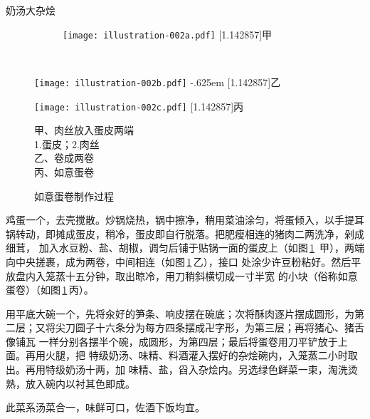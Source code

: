 \begin{recipe}{奶汤大杂烩}
\begin{figure}[h]
%
%
\vspace{-.6875\baselineskip}%
\begin{subfigure}[h]{\linewidth}%
\centering%
\texttt{[image: illustration-002a.pdf]}%
\baselineskip%
\hbox{\fsfamily\scalebox{1}[1.142857]{甲}}%
\end{subfigure}%
\vspace{.3125\baselineskip}%
\\%
\parbox{14.75em}{%
	\hspace{4em}\texttt{[image: illustration-002b.pdf]}%
	\kern-.625em\baselineskip%
	\hbox{\fsfamily\scalebox{1}[1.142857]{乙}}%
}%
\begin{minipage}{11em}
	\vspace{.25\baselineskip}%
	\texttt{[image: illustration-002c.pdf]}%
	\baselineskip%
	\hbox{\fsfamily\scalebox{1}[1.142857]{丙}}%
	\vspace{1.25\baselineskip}%
	\caption{如意蛋卷制作过程}
	\label{fig:egg-roll}
	\vspace{1\baselineskip}%
	\begingroup%
	\small%
	\noindent%
	\null\hspace{1.5em}甲、肉丝放入蛋皮两端\\
	\null\hspace{3.5em}1.蛋皮；\hspace{1em}2.肉丝\\
	\null\hspace{1.5em}乙、卷成两卷\\
	\null\hspace{1.5em}丙、如意蛋卷
	\endgroup
\end{minipage}
\vspace{-.75\baselineskip}%
\end{figure}%

\step 鸡蛋一个，去壳搅散。炒锅烧热，锅中擦净，稍用菜油涂匀，将蛋倾入，以手提耳
锅转动，即摊成蛋皮，稍冷，蛋皮即自行脱落。把肥瘦相连的猪肉二两洗净，剁成细茸，
加入水豆粉、盐、胡椒，调匀后铺于贴锅一面的蛋皮上（如图\,\ref{fig:egg-roll}\,%
甲），两端向中央搓裹，成为两卷，中间相连（如图\,\ref{fig:egg-roll}\,乙），接口
处涂少许豆粉粘好。然后平放盘内入笼蒸十五分钟，取出晾冷，用刀稍斜横切成一寸半宽
的小块（俗称如意蛋卷）（如图\,\ref{fig:egg-roll}\,丙）。

\step 用平底大碗一个，先将汆好的笋条、响皮摆在碗底；次将酥肉逐片摆成圆形，为第
二层；又将尖刀圆子十六条分为每方四条摆成卍字形，为第三层；再将猪心、猪舌像铺瓦
一样分别各摆半个碗，成圆形，为第四层；最后将蛋卷用刀平铲放于上面。再用火腿，把
特级奶汤、味精、料酒灌入摆好的杂烩碗内，入笼蒸二小时取出。再用特级奶汤十两，加
味精、盐，舀入杂烩内。另选绿色鲜菜一束，淘洗烫熟，放入碗内以衬其色即成。

\features

此菜系汤菜合一，味鲜可口，佐酒下饭均宜。

\end{recipe}

